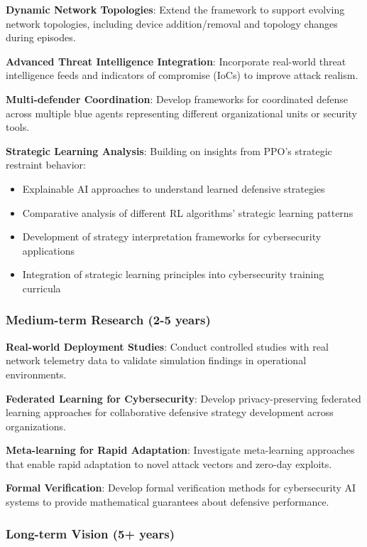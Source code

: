 \documentclass[12pt,twoside]{article}
\begin{document}
\textbf{Dynamic Network Topologies}: Extend the framework to support evolving network topologies, including device addition/removal and topology changes during episodes.

\textbf{Advanced Threat Intelligence Integration}: Incorporate real-world threat intelligence feeds and indicators of compromise (IoCs) to improve attack realism.

\textbf{Multi-defender Coordination}: Develop frameworks for coordinated defense across multiple blue agents representing different organizational units or security tools.

\textbf{Strategic Learning Analysis}: Building on insights from PPO's strategic restraint behavior:
\begin{itemize}
\item Explainable AI approaches to understand learned defensive strategies
\item Comparative analysis of different RL algorithms' strategic learning patterns
\item Development of strategy interpretation frameworks for cybersecurity applications
\item Integration of strategic learning principles into cybersecurity training curricula
\end{itemize}

\subsubsection{Medium-term Research (2-5 years)}

\textbf{Real-world Deployment Studies}: Conduct controlled studies with real network telemetry data to validate simulation findings in operational environments.

\textbf{Federated Learning for Cybersecurity}: Develop privacy-preserving federated learning approaches for collaborative defensive strategy development across organizations.

\textbf{Meta-learning for Rapid Adaptation}: Investigate meta-learning approaches that enable rapid adaptation to novel attack vectors and zero-day exploits.

\textbf{Formal Verification}: Develop formal verification methods for cybersecurity AI systems to provide mathematical guarantees about defensive performance.

\subsubsection{Long-term Vision (5+ years)}
\end{document}
